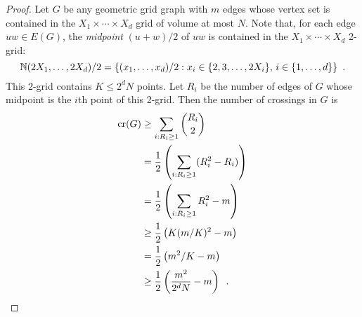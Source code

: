 \documentclass{patmorin}
\newcommand{\n}{N}
\DeclareMathOperator{\crs}{cr}
\begin{document}
\begin{proof}
  Let $G$ be any geometric grid graph with $m$ edges whose vertex set
  is contained in the $X_1\times \cdots\times X_d$ grid of volume
  at most $\n$.  Note that,
  for each edge $uw\in E(G)$, the \emph{midpoint} $(u+w)/2$ of $uw$
  is contained in the $X_1\times\cdots\times X_d$ 2-grid:
  \[
    \mathbb{N}(2X_1,\ldots,2X_d)/2=\{(x_1,\ldots,x_d)/2:
         \mbox{$x_i \in \{2,3,\ldots,2X_i\}$, 
               $i\in\{1,\ldots,d\}$}\} \enspace .
  \]
  This 2-grid contains $K\le 2^d\n$ points.  Let $R_i$ be the number of
  edges of $G$ whose midpoint is the $i$th point of this 2-grid. Then
  the number of crossings in $G$ is
  \begin{align*}
   \crs(G) &\ge \sum_{i:R_i\ge 1}\binom{R_i}{2} \\
    & = \frac{1}{2}\left(\sum_{i:R_i\ge 1}(R_i^2-R_i)\right) \\
    & = \frac{1}{2}\left(\sum_{i:R_i\ge 1} R_i^2 - m\right) \\
    & \ge \frac{1}{2}\left(K(m/K)^2 - m\right) \\
    & = \frac{1}{2}\left(m^2/K - m\right) \\
    & \ge \frac{1}{2}\left(\frac{m^2}{2^{d}\n} - m\right) \enspace . \qedhere
  \end{align*}
%
\end{proof}
\end{document}
